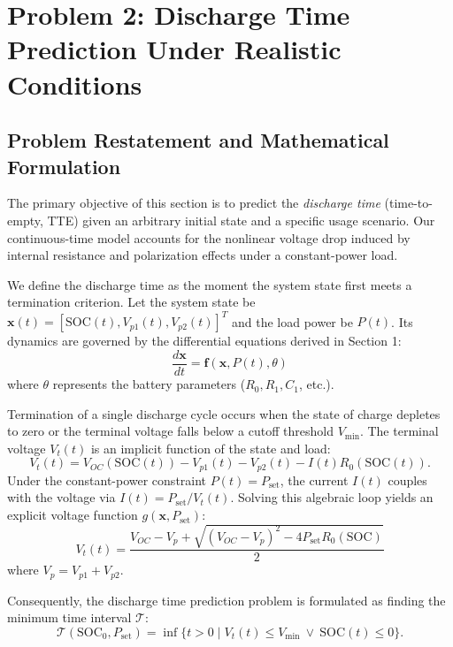 \section{Problem 2: Discharge Time Prediction Under Realistic Conditions}

\subsection{Problem Restatement and Mathematical Formulation}
The primary objective of this section is to predict the \textit{discharge time} (time-to-empty, TTE) 
given an arbitrary initial state and a specific usage scenario. Our continuous-time model accounts 
for the nonlinear voltage drop induced by internal resistance and polarization effects under a 
constant-power load.

We define the discharge time as the moment the system state first meets a termination criterion. 
Let the system state be $\mathbf{x}(t) = [\text{SOC}(t), V_{p1}(t), V_{p2}(t)]^T$ and the load power 
be $P(t)$. Its dynamics are governed by the differential equations derived in Section 1:
\begin{equation}
\frac{d\mathbf{x}}{dt} = \mathbf{f}(\mathbf{x}, P(t), \theta)
\end{equation}
where $\theta$ represents the battery parameters ($R_0, R_1, C_1$, etc.).

Termination of a single discharge cycle occurs when the state of charge depletes to zero or 
the terminal voltage falls below a cutoff threshold $V_{\min}$. The terminal voltage $V_{t}(t)$ is 
an implicit function of the state and load:
\begin{equation}
V_{t}(t) = V_{OC}(\text{SOC}(t)) - V_{p1}(t) - V_{p2}(t) - I(t)R_0(\text{SOC}(t)).
\end{equation}
Under the constant-power constraint $P(t) = P_{\text{set}}$, the current $I(t)$ couples with the 
voltage via $I(t) = P_{\text{set}}/V_{t}(t)$. Solving this algebraic loop yields an explicit voltage 
function $g(\mathbf{x}, P_{\text{set}})$:
\begin{equation}
V_{t}(t) = \frac{V_{OC} - V_{p} + \sqrt{(V_{OC} - V_{p})^2 - 4 P_{\text{set}} R_0(\text{SOC})}}{2}
\end{equation}
where $V_p = V_{p1} + V_{p2}$.

Consequently, the discharge time prediction problem is formulated as finding the minimum 
time interval $\mathcal{T}$:
\begin{equation}
\mathcal{T}(\text{SOC}_0, P_{\text{set}}) = \inf \{ t > 0 \mid V_{t}(t) \le V_{\min} \ \lor \ \text{SOC}(t) \le 0 \}.
\end{equation}

